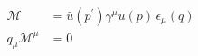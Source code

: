 \documentclass[border=12pt]{standalone}
\begin{document}
$\displaystyle \begin{aligned}\mathcal{M}&=\bar{u}(p^{\prime})\gamma^{\mu}u(p)\,\epsilon_{\mu}(q)\\q_{\mu}\mathcal{M}^{\mu}&=0\end{aligned}$
\end{document}
